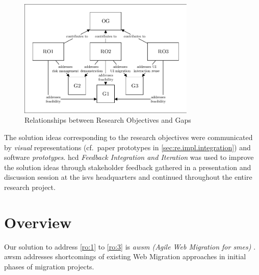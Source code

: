 \begin{figure}[hbt]
\hypertarget{fig:gaps-ro}{%
\centering%
\includegraphics[width=0.75\textwidth]{../figures/gaps-ro.pdf}%
\caption{Relationships between Research Objectives and Gaps}%
\label{fig:gaps-ro}%
}
\end{figure}

The solution ideas corresponding to the research objectives were communicated by \emph{visual} representations (cf.~paper prototypes in \cref{sec:re.impl.integration}) and software \emph{prototypes}.
\gls{hcd} \emph{Feedback Integration and Iteration} was used to improve the solution ideas through stakeholder feedback gathered in a presentation and discussion session at the \glspl{isv} headquarters and continued throughout the entire research project.



\vspace{-20pt}
\hypertarget{sec:solution-overview}{%
\section{Overview}\label{sec:solution-overview}}
\vspace{10pt}

Our solution to address \cref{ro:1} to \cref{ro:3} is \emph{\gls{awsm} (Agile Web Migration for \glspl{sme})} \autocite{Heil2016AWSM}.
\gls{awsm} addresses shortcomings of existing \gls{Web Migration} approaches in initial phases of migration projects.

